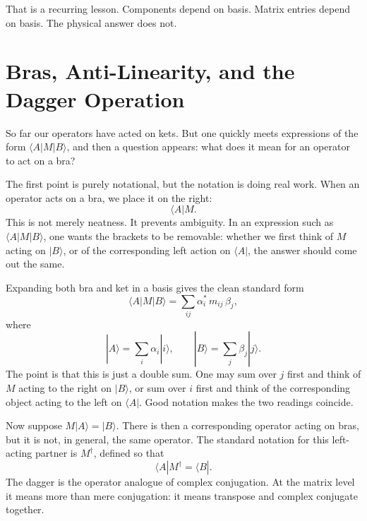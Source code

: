 That is a recurring lesson. Components depend on basis. Matrix entries depend on basis. The physical answer does not.

\section{Bras, Anti-Linearity, and the Dagger Operation}

So far our operators have acted on kets. But one quickly meets expressions of the form \(\langle A|M|B\rangle\), and then a question appears: what does it mean for an operator to act on a bra?

The first point is purely notational, but the notation is doing real work. When an operator acts on a bra, we place it on the right:
\begin{equation}
\langle A|M.
\end{equation}
This is not merely neatness. It prevents ambiguity. In an expression such as \(\langle A|M|B\rangle\), one wants the brackets to be removable: whether we first think of \(M\) acting on \(|B\rangle\), or of the corresponding left action on \(\langle A|\), the answer should come out the same.

Expanding both bra and ket in a basis gives the clean standard form
\begin{equation}
\langle A|M|B\rangle=\sum_{ij}\alpha_i^*\,m_{ij}\,\beta_j,
\end{equation}
where
\begin{equation}
|A\rangle=\sum_i \alpha_i|i\rangle,
\qquad
|B\rangle=\sum_j \beta_j|j\rangle.
\end{equation}
The point is that this is just a double sum. One may sum over \(j\) first and think of \(M\) acting to the right on \(|B\rangle\), or sum over \(i\) first and think of the corresponding object acting to the left on \(\langle A|\). Good notation makes the two readings coincide.

Now suppose \(M|A\rangle=|B\rangle\). There is then a corresponding operator acting on bras, but it is not, in general, the same operator. The standard notation for this left-acting partner is \(M^\dagger\), defined so that
\begin{equation}
\langle A|M^\dagger=\langle B|.
\end{equation}
The dagger is the operator analogue of complex conjugation. At the matrix level it means more than mere conjugation: it means transpose and complex conjugate together.

